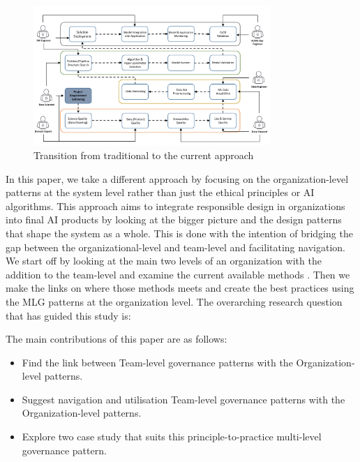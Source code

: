 \documentclass[conference]{IEEEtran}
\begin{document}
\begin{figure}[htbp!!]
	\centering
	\includegraphics[width=0.8\textwidth]{Workflow.png}
	\caption{Transition from traditional to the current approach}
	\label{ReMixMatch}
\end{figure}
In this paper, we take a different approach by focusing on the organization-level patterns at the system level rather than just the ethical principles or AI algorithms. This approach aims to integrate responsible design in organizations into final AI products by looking at the bigger picture and the design patterns that shape the system as a whole. This is done with the intention of bridging the gap between the organizational-level and team-level and facilitating navigation. We start off by looking at the main two levels of an organization with the addition to the team-level and examine the current available methods \cite{Shneiderman, ShneidermanRespo, Jana, Hussain, roadmap}. Then we make the links on where those methods meets and create the best practices using the MLG patterns at the organization level. The overarching research question that has guided this study is:


\vskip 0.1in
\vskip 0.1in

\noindent{}

\vskip 0.1in
\vskip 0.1in

The main contributions of this paper are as follows:
\begin{itemize}
\item Find the link between Team-level governance patterns with the Organization-level patterns.
\item Suggest navigation and utilisation Team-level governance patterns with the Organization-level patterns.
\item Explore two case study that suits this principle-to-practice multi-level governance pattern.
\end{itemize}
\smallskip
\end{document}
